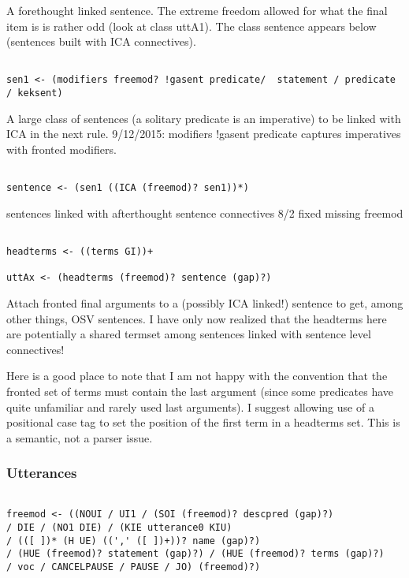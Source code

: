 \documentclass[12pt]{article}
\begin{document}
A forethought linked sentence.  The extreme freedom allowed for what the final item is is rather odd (look at class
uttA1).  The class sentence appears below (sentences built with ICA connectives).

\begin{verbatim}

sen1 <- (modifiers freemod? !gasent predicate/  statement / predicate / keksent)

\end{verbatim}

A large class of sentences (a solitary predicate is an imperative) to be linked with ICA in the next rule.  9/12/2015:  modifiers !gasent predicate
captures imperatives with fronted modifiers.

\begin{verbatim}

sentence <- (sen1 ((ICA (freemod)? sen1))*)

\end{verbatim}

sentences linked with afterthought sentence connectives
8/2 fixed missing freemod

\begin{verbatim}

headterms <- ((terms GI))+

uttAx <- (headterms (freemod)? sentence (gap)?)

\end{verbatim}

Attach fronted final arguments to a (possibly ICA linked!) sentence to get, among other things, OSV sentences.
I have only now realized that the headterms here are potentially a shared termset among sentences linked with sentence level connectives!

Here is a good place to note that I am not happy with the convention that the fronted set of terms must contain
the last argument (since some predicates have quite unfamiliar and rarely used last arguments).  I suggest allowing
use of a positional case tag to set the position of the first term in a headterms set.  This is a semantic, not a parser issue.

\subsubsection{Utterances}

\begin{verbatim}

freemod <- ((NOUI / UI1 / (SOI (freemod)? descpred (gap)?) 
/ DIE / (NO1 DIE) / (KIE utterance0 KIU) 
/ (([ ])* (H UE) ((',' ([ ])+))? name (gap)?) 
/ (HUE (freemod)? statement (gap)?) / (HUE (freemod)? terms (gap)?) 
/ voc / CANCELPAUSE / PAUSE / JO) (freemod)?)

\end{verbatim}
\end{document}
